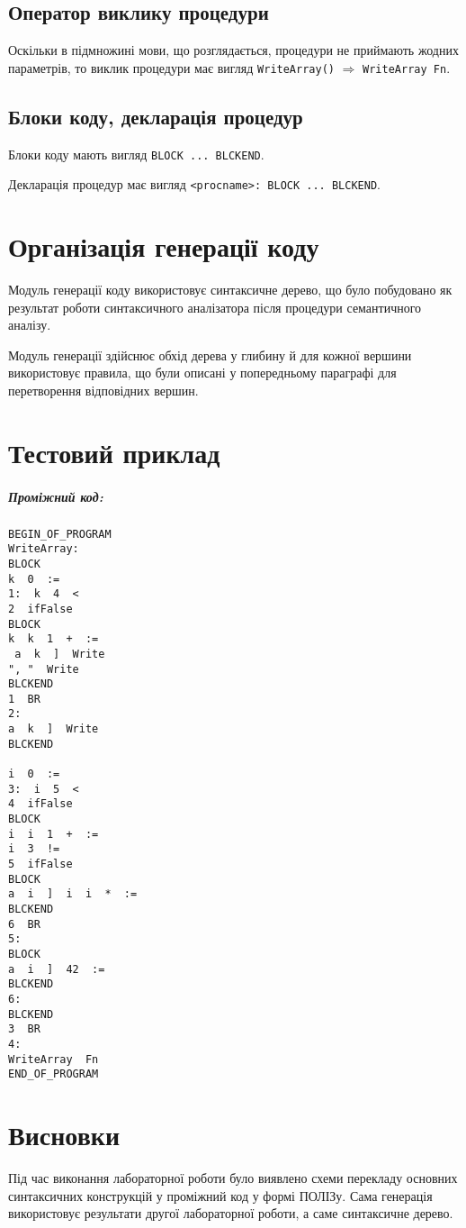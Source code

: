 \documentclass[a4paper,12pt,notitlepage,pdftex]{scrreprt}
\begin{document}
    \section{Оператор виклику процедури}
        Оскільки в підмножині мови, що розглядається, процедури не приймають жодних параметрів, то виклик процедури
        має вигляд \verb"WriteArray()" $\Rightarrow$ \verb$WriteArray Fn$.
    \section{Блоки коду, декларація процедур}
        Блоки коду мають вигляд \verb$BLOCK ... BLCKEND$.

        Декларація процедур має вигляд \verb$<procname>: BLOCK ... BLCKEND$.
\chapter{Організація генерації коду}
    Модуль генерації коду використовує синтаксичне дерево, що було побудовано як результат роботи синтаксичного
    аналізатора після процедури семантичного аналізу.

    Модуль генерації здійснює обхід дерева у глибину й для кожної вершини використовує правила, що були описані у
    попередньому параграфі для перетворення відповідних вершин.
\chapter{Тестовий приклад}
\label{chap:fourth}
        
        \paragraph{Проміжний код:}
        \begin{verbatim}
BEGIN_OF_PROGRAM
WriteArray:
BLOCK
k  0  :=
1:  k  4  <
2  ifFalse
BLOCK
k  k  1  +  :=
 a  k  ]  Write
", "  Write
BLCKEND
1  BR
2:
a  k  ]  Write
BLCKEND

i  0  :=
3:  i  5  <
4  ifFalse
BLOCK
i  i  1  +  :=
i  3  !=
5  ifFalse
BLOCK
a  i  ]  i  i  *  :=
BLCKEND
6  BR
5:
BLOCK
a  i  ]  42  :=
BLCKEND
6:
BLCKEND
3  BR
4:
WriteArray  Fn
END_OF_PROGRAM
\end{verbatim}

\chapter{Висновки}
\label{chap:concl}
    Під час виконання лабораторної роботи було виявлено схеми перекладу основних синтаксичних конструкцій у проміжний
    код у формі ПОЛІЗу.
    Сама генерація використовує результати другої лабораторної роботи, а саме синтаксичне дерево.
\end{document}
